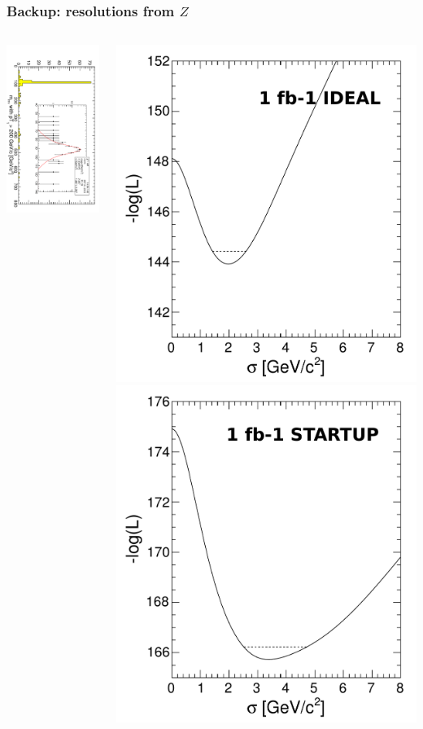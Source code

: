 \documentclass[compress]{beamer}
\begin{document}
\begin{frame}
\frametitle{Backup: resolutions from $Z$}
\begin{columns}
\includegraphics[height=\linewidth, angle=90]{mass_200.pdf}

\includegraphics[width=0.49\linewidth]{loglike_ideal.pdf}
\includegraphics[width=0.49\linewidth]{loglike_startup.pdf}


\end{columns}
\end{frame}
\end{document}
